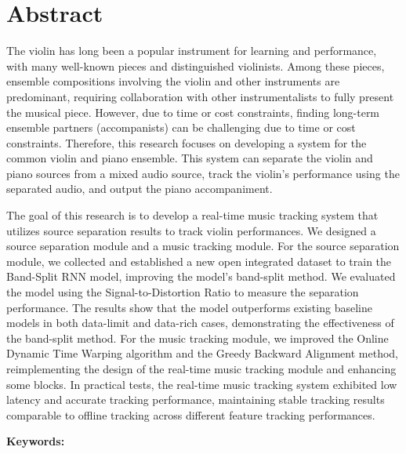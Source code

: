 \documentclass[class=NCU_thesis, crop=false]{standalone}
\begin{document}
\chapter{Abstract}

The violin has long been a popular instrument for learning and performance, 
with many well-known pieces and distinguished violinists. 
Among these pieces, ensemble compositions involving the violin and other instruments are predominant, 
requiring collaboration with other instrumentalists to fully present the musical piece.
However, due to time or cost constraints, 
finding long-term ensemble partners (accompanists) can be challenging due to time or cost constraints.
Therefore, this research focuses on developing a system for the common violin and piano ensemble. 
This system can separate the violin and piano sources from a mixed audio source,
track the violin's performance using the separated audio, 
and output the piano accompaniment.

The goal of this research is to develop a real-time music tracking system 
that utilizes source separation results to track violin performances.
We designed a source separation module and a music tracking module. 
For the source separation module, 
we collected and established a new open integrated dataset to train the Band-Split RNN model, 
improving the model's band-split method. 
We evaluated the model using the Signal-to-Distortion Ratio 
to measure the separation performance.
The results show that the model outperforms existing baseline models 
in both data-limit and data-rich cases, 
demonstrating the effectiveness of the band-split method.
For the music tracking module, 
we improved the Online Dynamic Time Warping algorithm and 
the Greedy Backward Alignment method, 
reimplementing the design of the real-time music tracking module and 
enhancing some blocks. 
In practical tests, the real-time music tracking system exhibited 
low latency and accurate tracking performance, 
maintaining stable tracking results comparable to offline tracking 
across different feature tracking performances.

\vspace{2em}
\noindent \textbf{Keywords:} \keywordsEn{} %
\end{document}
